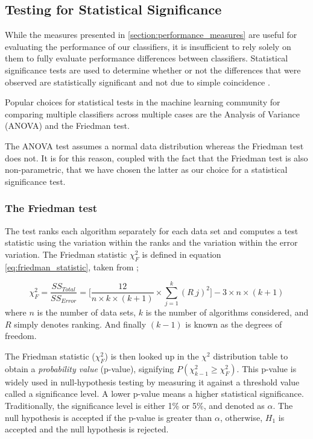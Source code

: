 \subsection{Testing for Statistical Significance}
While the measures presented in \ref{section:performance_measures} are useful for evaluating the performance of our classifiers, it is insufficient to rely solely on them to fully evaluate performance differences between classifiers. Statistical significance tests are used to determine whether or not the differences that were observed are statistically significant and not due to simple coincidence \cite{japkowicz2011evaluating}.

Popular choices for statistical tests in the machine learning community for comparing multiple classifiers across multiple cases are the Analysis of Variance (ANOVA) and the Friedman test. 

The ANOVA test assumes a normal data distribution whereas the Friedman test does not. It is for this reason, coupled with the fact that the Friedman test is also non-parametric, that we have chosen the latter as our choice for a statistical significance test. 

\subsubsection{The Friedman test}
The test ranks each algorithm separately for each data set and computes a test statistic using the variation within the ranks and the variation within the error variation. The Friedman statistic $\chi^2_F$ is defined in equation \ref{eq:friedman_statistic}, taken from \cite{japkowicz2011evaluating};

\begin{equation}
\label{eq:friedman_statistic}
\chi^2_F = \frac{SS_{Total}}{SS_{Error}}=\bigg[\frac{12}{n\times k\times(k+1)}\times\sum_{j=1}^k(R_.j)^2\bigg]-3\times n \times (k+1)
\end{equation}where $n$ is the number of data sets, $k$ is the number of algorithms considered, and $R$ simply denotes ranking. And finally $(k-1)$ is known as the degrees of freedom.

The Friedman statistic ($\chi^2_F$) is then looked up in the $\chi^2$ distribution table to obtain a \textit{probability value} (p-value), signifying $P(\chi^2_{k-1} \geq \chi^2_F )$. This p-value is widely used in null-hypothesis testing by measuring it against a threshold value called a significance level. A lower p-value means a higher statistical significance. Traditionally, the significance level is either 1\% or 5\%, and denoted as $\alpha$. The null hypothesis is accepted if the p-value is greater than $\alpha$, otherwise, $H_1$ is accepted and the null hypothesis is rejected.

